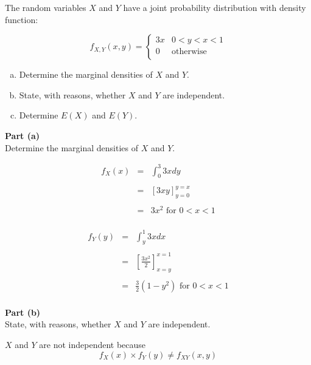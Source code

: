 \documentclass[a4paper,12pt]{article}
\begin{document}
\large
\noindent The random variables $X$ and $Y$ have a joint probability distribution with density
function:

\[
f_{X,Y}( x , y ) = \begin{cases}
3x & 0 < y < x < 1\\
0 & \mbox{otherwise}\\
\end{cases}
\]
\begin{enumerate}[(a)]
\item Determine the marginal densities of $X$ and $Y$.
\item State, with reasons, whether $X$ and $Y$ are independent.
\item Determine $E(X)$ and $E(Y)$.
\end{enumerate}

\newpage
\begin{framed}
\large 
\noindent \textbf{Part (a)}\\
Determine the marginal densities of $X$ and $Y$.
\end{framed}

\large

\begin{eqnarray*}
f_X(x) 
&=& \int^3_{0} 3x dy \\
& & \\
&=&  {\left[ 3xy \right]^{y=x}_{y=0} } \\
& & \\
&=& 3x^2 \mbox{ for }  0 < x < 1 \\
\end{eqnarray*}

\begin{eqnarray*}
f_Y(y) 
&=& \int^1_{y} 3x dx \\
& & \\
&=& \left[ \frac{3x^2}{2} \right]^{x=1}_{x=y}\\
& & \\
&=& \frac{3}{2} (1-y^2) \mbox{ for }  0 < x < 1 \\
\end{eqnarray*}

\newpage
\begin{framed}
\large 
\noindent \textbf{Part (b)}\\
State, with reasons, whether $X$ and $Y$ are independent.
\end{framed}
$X$ and $Y$ are not independent because
\[f_X(x) \times f_Y(y)  \neq f_{XY} (x,y)\]
\end{document}
